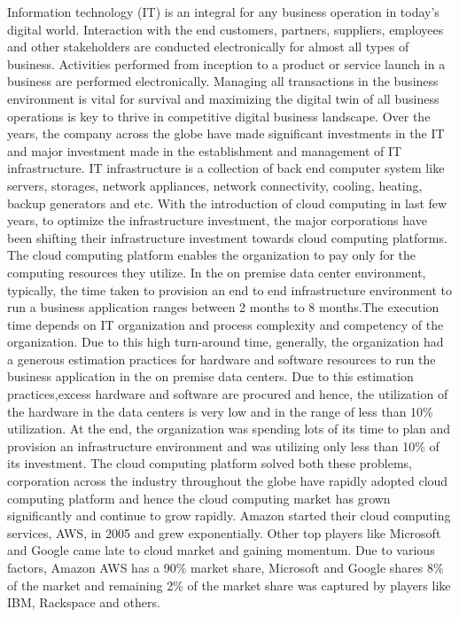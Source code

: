 \documentclass[fleqn,10pt]{SelfArx} %
\begin{document}
Information technology (IT) is an integral for any business operation in today's digital world. Interaction with the end customers, partners, suppliers, employees and other stakeholders are conducted electronically for almost all types of business. Activities performed from inception to a product or service launch in a business are performed electronically. Managing all transactions in the business environment is vital for survival and maximizing the digital twin of all business operations is key to thrive in competitive digital business landscape. Over the years, the company across the globe have made significant investments in the IT and major investment made in the establishment and management of IT infrastructure. IT infrastructure is a collection of back end computer system like servers, storages, network appliances, network connectivity, cooling, heating, backup generators and etc. 
With the introduction of cloud computing in last few years, to optimize the infrastructure investment, the major corporations have been shifting their infrastructure investment towards cloud computing platforms. The cloud computing platform enables the organization to pay only for the computing resources they utilize. In the on premise data center environment, typically, the time taken to provision an end to end infrastructure environment to run a business application ranges between 2 months to 8 months.The execution time  depends on IT organization and process complexity and competency of the organization. Due to this high turn-around time, generally, the organization had a generous estimation practices for hardware and software resources to run the business application in the on premise data centers.  Due to this estimation practices,excess hardware and software are procured and hence, the utilization of the hardware in the data centers is very low and in the range of less than 10\% utilization. At the end, the organization was spending lots of its time to plan and provision an infrastructure environment and was utilizing only less than 10\% of its investment. The cloud computing platform solved both these problems, corporation across the industry throughout the globe have rapidly adopted cloud computing platform and hence the cloud computing market has grown significantly and continue to grow rapidly. 
 Amazon started their cloud computing services, AWS, in 2005 and grew exponentially. Other top players like Microsoft and Google came late to cloud market and gaining momentum. Due to various factors, Amazon AWS has a 90\% market share, Microsoft and Google shares 8\% of the market and remaining 2\% of the market share was captured by players like IBM, Rackspace and others. 
\end{document}

